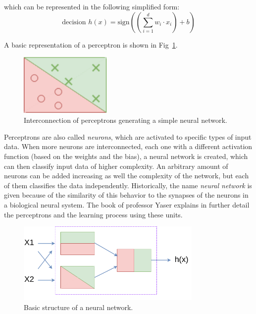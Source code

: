 which can be represented in the following simplified form:
\begin{equation}
    \text{decision } h(x) = \text{sign}\left(  \left( \sum_{i=1}^{d} w_i\cdot x_i \right )+ b \right )
\end{equation}

A basic representation of a perceptron is shown in Fig~\ref{fig:perceptron}.

\begin{figure}[!htb]
    \centering
      \includegraphics[width=0.4\textwidth]{figures/perceptron}
      \caption{Interconnection of perceptrons generating a simple neural network. \cite{Yaser}}
      \label{fig:perceptron}
\end{figure}

Perceptrons are also called \emph{neurons}, which are activated to specific types of input data. When more neurons are interconnected, each one with a different activation function (based on the weights and the bias), a neural network is created, which can then classify input data of higher complexity. An arbitrary amount of neurons can be added increasing as well the complexity of the network, but each of them classifies the data independently. Historically, the name \emph{neural network} is given because of the similarity of this behavior to the synapses of the neurons in a biological neural system. The book of professor Yaser \cite{Yaser} explains in further detail the perceptrons and the learning process using these units.

\begin{figure}[!htb]
    \centering
      \includegraphics[width=0.8\textwidth]{figures/neuralnetwork}
      \caption{Basic structure of a neural network.}
      \label{fig:neuralnetwork}
\end{figure}

